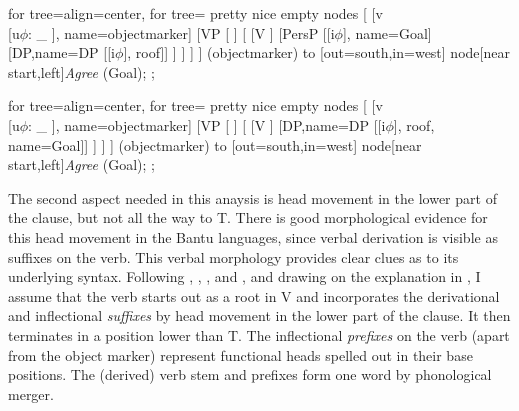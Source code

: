 \documentclass[output=paper
,modfonts
,nonflat]{langsci/langscibook}
\begin{document}
\begin{exe}
	\ex {}
	\xlist
	\ex \begin{forest} for tree={align=center}, for tree= pretty nice empty nodes
			[
			[v \\{[}u$\phi$: \_ {]}, name=objectmarker]
			[VP [ ]
			[
			[V ]  				
			[PersP
			[{[}i$\phi${]}, name=Goal]  
			[DP,name=DP [{[}i$\phi${]}, roof]]
			] ] ] ] 	
			 (objectmarker) to [out=south,in=west] node[near start,left]{\textit{Agree}} (Goal);	
			;
	\end{forest}%
	\ex \begin{forest} for tree={align=center}, for tree= pretty nice empty nodes
			[
			[v \\{[}u$\phi$: \_ {]}, name=objectmarker]
			[VP [ ]
			[
			[V ]  				
			[DP,name=DP [{[}i$\phi${]}, roof, name=Goal]]
			] ] ] 	
			 (objectmarker) to [out=south,in=west] node[near start,left]{\textit{Agree}} (Goal);	
			;
	\end{forest}
	\endxlist
\end{exe} 
The second aspect needed in this anaysis is head movement in the lower part of the clause, but not all the way to T. There is good morphological evidence for this head movement in the Bantu languages, since verbal derivation is visible as suffixes on the verb. This verbal morphology provides clear clues as to its underlying syntax. Following \citet{Myers1990}, \citet{Julien2002}, \citet{Kinyalolo2003}, and \citet{Buell2005}, and drawing on the explanation in \citet{Van_der_Wal2009}, I assume that the verb starts out as a root in V and incorporates the derivational and inflectional \textit{suffixes} by head movement in the lower part of the clause. It then terminates in a position lower than T. The inflectional \textit{prefixes} on the verb (apart from the object marker) represent functional heads spelled out in their base positions. The (derived) verb stem and prefixes form one word by phonological merger.
\end{document}
